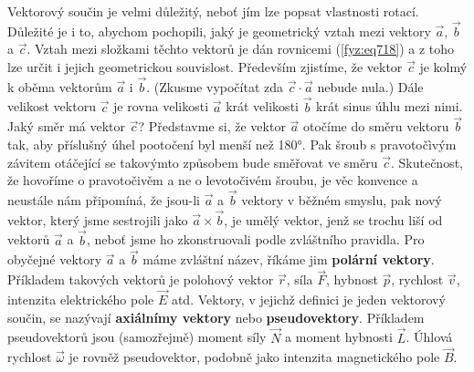     Vektorový součin je velmi důležitý, neboť jím lze popsat vlastnosti rotací. Důležité je i to,
    abychom pochopili, jaký je geometrický vztah mezi vektory \(\vec{a}\), \(\vec{b}\) a
    \(\vec{c}\). Vztah mezi složkami těchto vektorů je dán rovnicemi (\ref{fyz:eq718}) a z toho lze
    určit i jejich geometrickou souvislost. Především zjistíme, že vektor \(\vec{c}\) je kolmý k
    oběma vektorům \(\vec{a}\) i \(\vec{b}\). (Zkusme vypočítat zda \(\vec{c}\cdot\vec{a}\) nebude
    nula.) Dále velikost vektoru \(\vec{c}\) je rovna velikosti \(\vec{a}\) krát velikosti
    \(\vec{b}\) krát sinus úhlu mezi nimi. Jaký směr má vektor \(\vec{c}\)? Představme si, že vektor
    \(\vec{a}\) otočíme do směru vektoru \(\vec{b}\) tak, aby příslušný úhel pootočení byl menší než
    \ang{180}. Pak šroub s pravotočìvým závitem otáčející se takovýmto způsobem bude směřovat ve
    směru \(\vec{c}\). Skutečnost, že hovoříme o pravotočivěm a ne o levotočivém šroubu, je věc
    konvence a neustále nám připomíná, že jsou-li \(\vec{a}\) a \(\vec{b}\)  vektory v
    běžném smyslu, pak nový vektor, který jsme sestrojili jako \(\vec{a}\times\vec{b}\), je umělý
    vektor, jenž se trochu liší od vektorů \( \vec{a}\) a \(\vec{b}\), neboť jsme ho zkonstruovali
    podle zvláštního pravidla. Pro obyčejné vektory \(\vec{a}\) a \(\vec{b}\) máme zvláštní název,
    říkáme jim \textbf{polární vektory}. Příkladem takových vektorů je polohový vektor \(\vec{r}\),
    síla \(\vec{F}\), hybnost \(\vec{p}\), rychlost \(\vec{v}\), intenzita elektrického pole
    \(\vec{E}\) atd. Vektory, v jejichž definici je jeden vektorový součin, se nazývají
    \textbf{axiálnímy vektory} nebo \textbf{pseudovektory}. Příkladem pseudovektorů jsou
    (samozřejmě) moment síly \(\vec{N}\) a moment hybnosti \(\vec{L}\). Úhlová rychlost
    \(\vec{\omega}\) je rovněž pseudovektor, podobně jako intenzita magnetického pole \(\vec{B}\).

